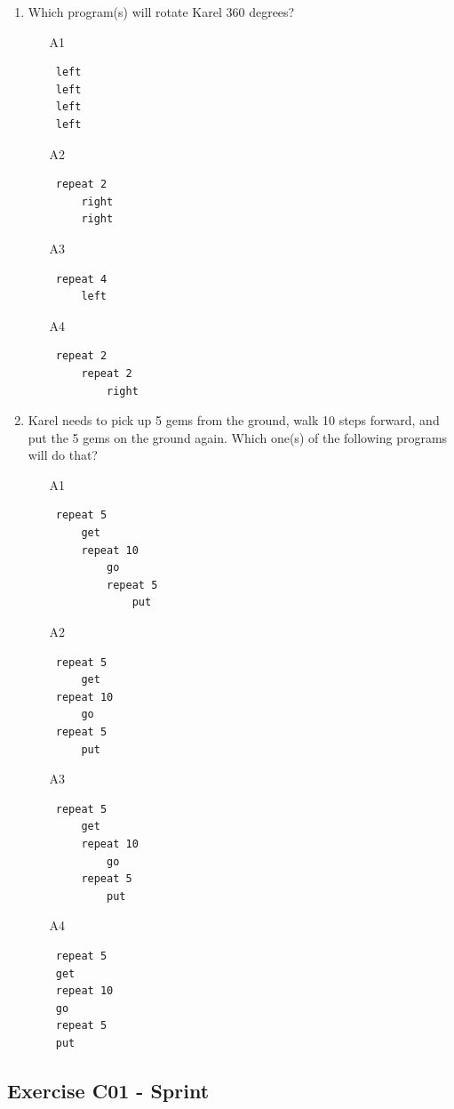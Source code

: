 {{\begin{enumerate}
\begin{enumerate}
\end{enumerate}
\item Which program(s) will rotate Karel 360 degrees?
\begin{enumerate}
\item[A1] 
\begin{verbatim}
 left
 left
 left
 left
\end{verbatim}
\item[A2] 
\begin{verbatim}
 repeat 2
     right
     right
\end{verbatim}
\item[A3] 
\begin{verbatim}
 repeat 4
     left
\end{verbatim}
\item[A4] 
\begin{verbatim}
 repeat 2
     repeat 2
         right
\end{verbatim}
\end{enumerate}
\item Karel needs to pick up 5 gems from the ground, walk 10 steps forward, and put the 5 gems 
      on the ground again. Which one(s) of the following programs will do that?
\begin{enumerate}
\item[A1] 
\begin{verbatim}
 repeat 5
     get
     repeat 10
         go
         repeat 5
             put
\end{verbatim}
\item[A2] 
\begin{verbatim}
 repeat 5
     get
 repeat 10
     go
 repeat 5
     put
\end{verbatim}
\item[A3] 
\begin{verbatim}
 repeat 5
     get
     repeat 10
         go
     repeat 5
         put
\end{verbatim}
\item[A4] 
\begin{verbatim}
 repeat 5
 get
 repeat 10
 go
 repeat 5
 put
\end{verbatim}
\end{enumerate}
\end{enumerate}

\subsection{Exercise C01 - Sprint}

}}

